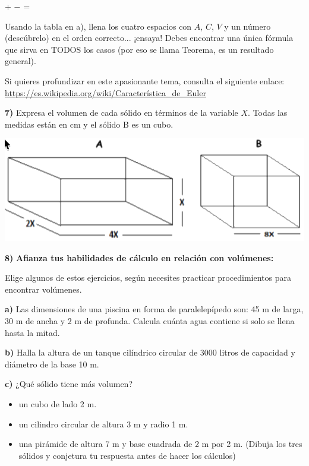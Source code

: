 \documentclass[12pt,a4paper]{article}
\begin{document}
\begin{multicols}{2}
\begin{center}
\underline{\hspace{1cm}} + \underline{\hspace{1cm}} $-$ \underline{\hspace{1cm}} = \underline{\hspace{1cm}}
\end{center}

Usando la tabla en a), llena los cuatro espacios con $A$, $C$, $V$ y un número (descúbrelo) en el orden correcto... ¡ensaya! Debes encontrar una única fórmula que sirva en TODOS los casos (por eso se llama Teorema, es un resultado general).

Si quieres profundizar en este apasionante tema, consulta el siguiente enlace: \url{https://es.wikipedia.org/wiki/Característica_de_Euler}
\vspace{5mm}

\textbf{7)} Expresa el volumen de cada sólido en términos de la variable $X$. Todas las medidas están en cm y el sólido B es un cubo.

\begin{center}
\includegraphics[width=0.9\columnwidth]{Figuras/fig51.png}
\end{center}

\textbf{8)} \textbf{Afianza tus habilidades de cálculo en relación con volúmenes:}

Elige algunos de estos ejercicios, según necesites practicar procedimientos para encontrar volúmenes.

\textbf{a)} Las dimensiones de una piscina en forma de paralelepípedo son: 45 m de larga, 30 m de ancha y 2 m de profunda. Calcula cuánta agua contiene si solo se llena hasta la mitad.

\textbf{b)} Halla la altura de un tanque cilíndrico circular de 3000 litros de capacidad y diámetro de la base 10 m.

\textbf{c)} ¿Qué sólido tiene más volumen?
\begin{itemize}[nosep]
    \item un cubo de lado 2 m.
    \item un cilindro circular de altura 3 m y radio 1 m.
    \item una pirámide de altura 7 m y base cuadrada de 2 m por 2 m. (Dibuja los tres sólidos y conjetura tu respuesta antes de hacer los cálculos)
\end{itemize}


\end{multicols}
\end{document}
